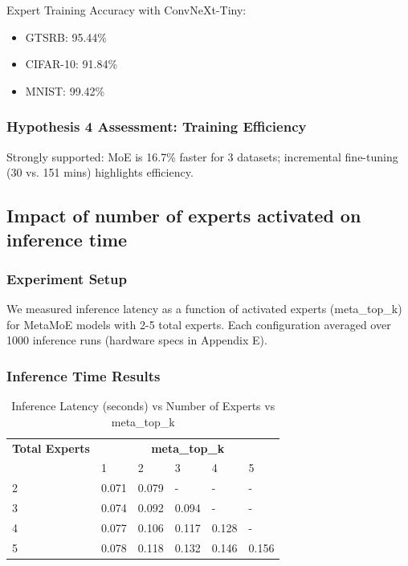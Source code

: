 \documentclass[11pt,a4paper]{article}
\begin{document}
Expert Training Accuracy with ConvNeXt-Tiny:
\begin{itemize}
    \item GTSRB: 95.44\%
    \item CIFAR-10: 91.84\%
    \item MNIST: 99.42\%
\end{itemize}

\subsubsection{Hypothesis 4 Assessment: Training Efficiency}

Strongly supported: MoE is 16.7\% faster for 3 datasets; incremental fine-tuning (30 vs. 151 mins) highlights efficiency.

\subsection{Impact of number of experts activated on inference time}

\subsubsection{Experiment Setup}

We measured inference latency as a function of activated experts (meta\_top\_k) for MetaMoE models with 2-5 total experts. Each configuration averaged over 1000 inference runs (hardware specs in Appendix E).

\subsubsection{Inference Time Results}

\begin{table}[H]
\centering
\begin{tabular}{llllll}
\toprule
\textbf{Total Experts} & \multicolumn{5}{c}{\textbf{meta\_top\_k}} \\
 & 1 & 2 & 3 & 4 & 5 \\
\midrule
2 & 0.071 & 0.079 & - & - & - \\
3 & 0.074 & 0.092 & 0.094 & - & - \\
4 & 0.077 & 0.106 & 0.117 & 0.128 & - \\
5 & 0.078 & 0.118 & 0.132 & 0.146 & 0.156 \\
\bottomrule
\end{tabular}
\caption{Inference Latency (seconds) vs Number of Experts vs meta\_top\_k}
\end{table}
\end{document}
